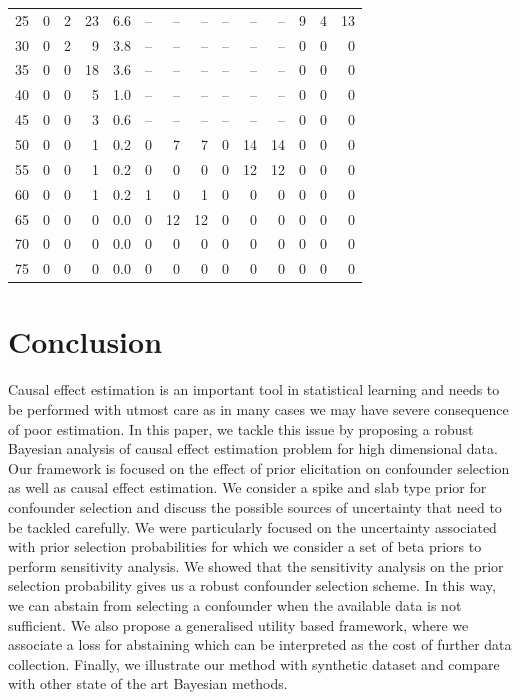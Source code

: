 \documentclass{amsart}
\begin{document}
\begin{table}[ht]
\begin{tabular}{|c||rrr|r||rr|r||rr|r||rr|r|}
25 &   0 &   2 &  23 & 6.6 & -- & -- & -- & -- & -- & -- &   9 &   4 & 13\\ 
  30 &   0 &   2 &   9 & 3.8 & -- & -- & -- & -- & -- & -- &   0 &   0 & 0 \\ 
  35 &   0 &   0 &  18 & 3.6 & -- & -- & -- & -- & -- & -- &   0 &   0 & 0 \\ 
  40 &   0 &   0 &   5 & 1.0 &-- & -- & -- & -- & -- & -- &   0 &   0 & 0 \\ 
  45 &   0 &   0 &   3 & 0.6 & -- & -- & -- & -- & -- & -- &   0 &   0 & 0 \\ 
  50 &   0 &   0 &   1 & 0.2 &  0 &   7 & 7 &   0 &  14 & 14 &   0 &   0 & 0 \\ 
  55 &   0 &   0 &   1 & 0.2 &  0 &   0 & 0 &  0 &  12 & 12 &  0 &   0 & 0 \\ 
  60 &   0 &   0 &   1 & 0.2 &  1 &   0 & 1 &  0 &   0 &  0 & 0 &  0 &   0 \\ 
  65 &   0 &   0 &   0 & 0.0 &  0 &  12 & 12 &  0 &   0 &  0 & 0 &  0 &   0 \\ 
  70 &   0 &   0 &   0 & 0.0 &  0 &   0 &  0 &  0 &   0 &  0 & 0 &  0 &   0 \\ 
  75 &   0 &   0 &   0 & 0.0 &  0 &   0 &  0 &  0 &   0 &  0 & 0 &  0 &   0 \\ 
   \hline
\end{tabular}
\end{table}

\section{Conclusion}\label{sec:conc}

Causal effect estimation is an important tool in statistical learning and needs to
be performed with utmost care as in many cases we may have severe consequence of poor estimation.
In this paper, we tackle this issue by proposing a robust Bayesian analysis of causal 
effect estimation problem for high dimensional data. Our 
framework is focused on the effect of prior elicitation on confounder selection
as well as causal effect estimation. We consider a spike and slab type
prior for confounder selection and discuss the possible sources of uncertainty that
need to be tackled carefully. We were particularly focused on the uncertainty associated
with prior selection probabilities for which we consider a set of beta priors to perform
sensitivity analysis. We showed that the sensitivity analysis on the prior selection probability
gives us a robust confounder selection scheme. In this way, we can abstain from selecting
a confounder when the available data is not sufficient. We also propose a generalised
utility based framework, where we associate a loss for abstaining which can be interpreted 
as the cost of further data collection. Finally, we illustrate our method with synthetic dataset
and compare with other state of the art Bayesian methods. 
\end{document}
